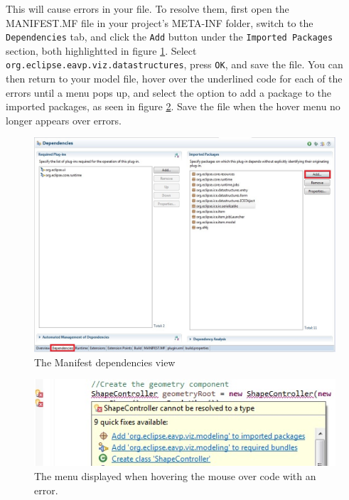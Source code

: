 This will cause errors in your file. To resolve them, first open the MANIFEST.MF
file in your project's META-INF folder, switch to the \texttt{Dependencies} tab,
and click the \texttt{Add} button under the \texttt{Imported Packages} section,
both highlightted in figure \ref{fig:manifest}. Select
\texttt{org.eclipse.eavp.viz.datastructures}, press \texttt{OK}, and save the
file. You can then return to your model file, hover over the underlined code
for each of the errors until a menu pops up, and select the option to add a
package to the imported packages, as seen in figure \ref{fig:hover}. Save the file when the hover menu no longer appears over
errors.

\begin{figure}[!h]
\includegraphics[width=\textwidth]{images/ManifestDependencies}
\centering
\caption{The Manifest dependencies view}
\label{fig:manifest}
\end{figure}

\begin{figure}[!h]
\includegraphics[width=\textwidth]{images/ErrorHoverMenu}
\centering
\caption{The menu displayed when hovering the mouse over code with an error.}
\label{fig:hover}
\end{figure}

